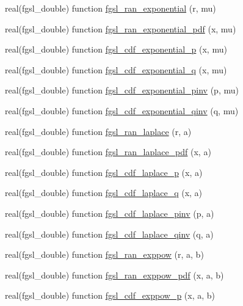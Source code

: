 \begin{DoxyCompactItemize}
\item 
real(fgsl\+\_\+double) function \hyperlink{rng_8finc_a6e0d7e6eadeddedceacd263ef26203d0}{fgsl\+\_\+ran\+\_\+exponential} (r, mu)
\item 
real(fgsl\+\_\+double) function \hyperlink{rng_8finc_ae756f259cb8ca3982f646f42a216c96c}{fgsl\+\_\+ran\+\_\+exponential\+\_\+pdf} (x, mu)
\item 
real(fgsl\+\_\+double) function \hyperlink{rng_8finc_a36e9a6ea0993d74b7a8cf7961709fe3c}{fgsl\+\_\+cdf\+\_\+exponential\+\_\+p} (x, mu)
\item 
real(fgsl\+\_\+double) function \hyperlink{rng_8finc_a955e14385e325a6372b465a576cac5c4}{fgsl\+\_\+cdf\+\_\+exponential\+\_\+q} (x, mu)
\item 
real(fgsl\+\_\+double) function \hyperlink{rng_8finc_a488b0d0037afbf0758a6494ea2c79d4b}{fgsl\+\_\+cdf\+\_\+exponential\+\_\+pinv} (p, mu)
\item 
real(fgsl\+\_\+double) function \hyperlink{rng_8finc_a8981dddfb5aa981d5819588d5e6ef0c3}{fgsl\+\_\+cdf\+\_\+exponential\+\_\+qinv} (q, mu)
\item 
real(fgsl\+\_\+double) function \hyperlink{rng_8finc_a4720051c5ef1f7ebcb32a852ac6664cb}{fgsl\+\_\+ran\+\_\+laplace} (r, a)
\item 
real(fgsl\+\_\+double) function \hyperlink{rng_8finc_ab7e39d0b6571ba191082ae83e3586791}{fgsl\+\_\+ran\+\_\+laplace\+\_\+pdf} (x, a)
\item 
real(fgsl\+\_\+double) function \hyperlink{rng_8finc_ae5ad59c95e21c0d422034ad7d56f8257}{fgsl\+\_\+cdf\+\_\+laplace\+\_\+p} (x, a)
\item 
real(fgsl\+\_\+double) function \hyperlink{rng_8finc_a2e38b7a4c5542ab96393a85ac86c3aa5}{fgsl\+\_\+cdf\+\_\+laplace\+\_\+q} (x, a)
\item 
real(fgsl\+\_\+double) function \hyperlink{rng_8finc_a372ea8f42cb280034be93978a227aac8}{fgsl\+\_\+cdf\+\_\+laplace\+\_\+pinv} (p, a)
\item 
real(fgsl\+\_\+double) function \hyperlink{rng_8finc_ae60ab38aedb8d6fb86fbc16d33b8e2fa}{fgsl\+\_\+cdf\+\_\+laplace\+\_\+qinv} (q, a)
\item 
real(fgsl\+\_\+double) function \hyperlink{rng_8finc_a3a4e76ecca55fc88d05ad1dd87b11ecd}{fgsl\+\_\+ran\+\_\+exppow} (r, a, b)
\item 
real(fgsl\+\_\+double) function \hyperlink{rng_8finc_a87c230357f577305a4bd93c4f304e2af}{fgsl\+\_\+ran\+\_\+exppow\+\_\+pdf} (x, a, b)
\item 
real(fgsl\+\_\+double) function \hyperlink{rng_8finc_a332787d73c8b7cc0a561b9de42eab974}{fgsl\+\_\+cdf\+\_\+exppow\+\_\+p} (x, a, b)

\end{DoxyCompactItemize}

